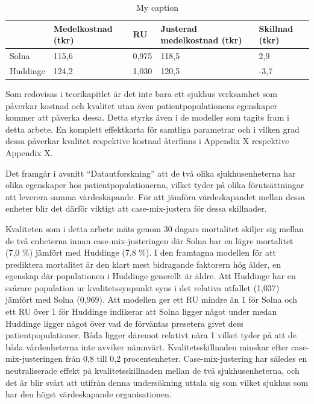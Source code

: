 \begin{table}[h]
\centering
\caption{My caption}
\label{my-label}
\begin{tabular}{|p{2cm}|p{3cm}|p{1cm}|p{3cm}|p{2cm}|}
\hline
         & Medelkostnad (tkr) & RU    & Justerad medelkostnad (tkr) & Skillnad (tkr) \\ \hline
Solna    & 115,6              & 0,975 & 118,5                       & 2,9            \\ \hline
Huddinge & 124,2              & 1,030 & 120,5                       & -3,7           \\ \hline
\end{tabular}
\end{table}

Som redovisas i teorikapitlet är det inte bara ett sjukhus verksamhet som påverkar kostnad och kvalitet utan även patientpopulationens egenskaper kommer att påverka dessa. Detta styrks även i de modeller som tagits fram i detta arbete. En komplett effektkarta för samtliga parametrar och i vilken grad dessa påverkar kvalitet respektive kostnad återfinns i Appendix X respektive Appendix X.

Det framgår i avsnitt “Datautforskning” att de två olika sjukhusenheterna har olika egenskaper hos patientpopulationerna, vilket tyder på olika förutsättningar att leverera samma värdeskapande. För att jämföra värdeskapandet mellan dessa enheter blir det därför viktigt att case-mix-justera för dessa skillnader.

Kvaliteten som i detta arbete mäts genom 30 dagars mortalitet skiljer sig mellan de två enheterna innan case-mix-justeringen där Solna har en lägre mortalitet (7,0 \%) jämfört med Huddinge (7,8 \%). I den framtagna modellen för att prediktera mortalitet är den klart mest bidragande faktorern hög ålder, en egenskap där populationen i Huddinge generellt är äldre. Att Huddinge har en svårare population ur kvalitetssynpunkt syns i det relativa utfallet (1,037) jämfört med Solna (0,969). Att modellen ger ett RU mindre än 1 för Solna och ett RU över 1 för Huddinge indikerar att Solna ligger något under medan Huddinge ligger något över vad de förväntas presetera givet dess patientpopulationer. Båda ligger däremot relativt nära 1 vilket tyder på att de båda vårdenheterna inte avviker nämnvärt. Kvalitetsskillnaden minskar efter case-mix-justeringen från 0,8 till 0,2 procentenheter. Case-mix-justering har således en neutraliserade effekt på kvalitetsskillnaden mellan de två sjukhusenheterna, och det är blir svårt att utifrån denna undersökning uttala sig som vilket sjukhus som har den högst värdeskapande organisationen.  


